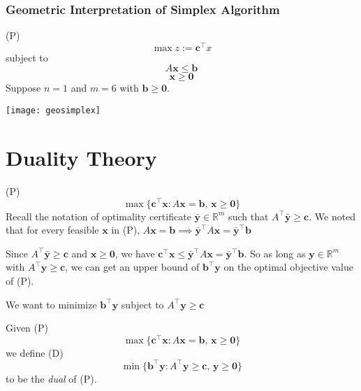 \subsection{Geometric Interpretation of Simplex Algorithm}
(P)
\[ \max z:=\bm{c}^\top x \]
subject to
\[ A \bm{x}\leqslant \bm{b} \]
\[ \bm{x}\geqslant  \bm{0} \]
Suppose $ n=1 $ and $ m=6 $ with $ \bm{b}\geqslant  \bm{0} $.

\begin{center}
    \texttt{[image: geosimplex]}
\end{center}

\chapter{Duality Theory}
 (P)
\[ \max \{\bm{c}^{\top} \bm{x}: A \bm{x}=\bm{b},\, \bm{x} \geqslant  \bm{0}\} \]
Recall the notation of optimality certificate $ \bm{\bar{y}}\in\mathbb{R}^m $ such that $ A ^\top \bm{\bar{y}}\geqslant  \bm{c} $. We noted that for
every feasible $ \bm{x} $ in (P), $ A \bm{x}= \bm{b}\implies
    \bm{\bar{y}}^\top A \bm{x}=\bm{\bar{y}}^\top \bm{b} $

Since $ A ^\top \bm{\bar{y}}\geqslant  \bm{c} $ and $ \bm{x}\geqslant  \bm{0} $,
we have $ \bm{c}^\top \bm{x}\leqslant \bm{\bar{y}}^\top A \bm{x} =
    \bm{\bar{y}}^\top \bm{b} $. So as long as $ \bm{y}\in\mathbb{R}^m $
with $ A ^\top \bm{y}\geqslant  \bm{c} $, we can get an upper bound
of $ \bm{b} ^\top\bm{y} $ on the optimal objective value of (P).

We want to minimize $ \bm{b}^\top\bm{y} $ subject to $ A ^\top \bm{y}\geqslant  \bm{c} $

\begin{defbox}
    \begin{definition}
        Given (P)
        \[ \max \{\bm{c}^{\top} \bm{x}: A \bm{x}=\bm{b},\, \bm{x} \geqslant  \bm{0}\} \]
        we define (D)
        \[ \min \{\bm{b}^{\top} \bm{y}: A^{\top} \bm{y} \geqslant  \bm{c},\, \bm{y} \geqslant  \bm{0}\}\]
        to be the \emph{dual} of (P).
    \end{definition}
\end{defbox}

